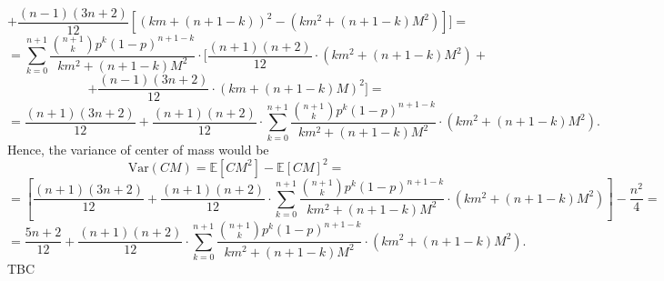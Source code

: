 \documentclass[11pt, twoside, reqno]{book}
\newcommand{\Var}{\text{Var}}
\newcommand{\E}{\mathbb{E}}
\begin{document}
$$+\frac{(n-1)(3n+2)}{12} \left[(km+(n+1-k))^{2}-(km^{2}+(n+1-k)M^{2})\right] \bigg]=$$
$$ =\sum_{k=0}^{n+1} \frac{\binom{n+1}{k}p^{k}(1-p)^{n+1-k}}{km^{2}+(n+1-k)M^2}\cdot \bigg[\frac{(n+1)(n+2)}{12}\cdot (km^{2}+(n+1-k)M^{2}) +$$
$$+ \frac{(n-1)(3n+2)}{12}\cdot (km+(n+1-k)M)^2 \bigg]=$$
$$=\frac{(n+1)(3n+2)}{12} +\frac{(n+1)(n+2)}{12} \cdot \sum_{k=0}^{n+1} \frac{\binom{n+1}{k}p^{k}(1-p)^{n+1-k}}{km^{2}+(n+1-k)M^2}\cdot \left(km^{2}+(n+1-k)M^{2}\right).$$
Hence, the variance of center of mass would be 
$$\Var(CM) = \E[CM^{2}]-\E[CM]^{2} =$$
$$=\left[ \frac{(n+1)(3n+2)}{12} +\frac{(n+1)(n+2)}{12} \cdot \sum_{k=0}^{n+1} \frac{\binom{n+1}{k}p^{k}(1-p)^{n+1-k}}{km^{2}+(n+1-k)M^2}\cdot \left(km^{2}+(n+1-k)M^{2}\right)\right] - \frac{n^{2}}{4}=$$
$$=\frac{5n+2}{12}+\frac{(n+1)(n+2)}{12} \cdot \sum_{k=0}^{n+1} \frac{\binom{n+1}{k}p^{k}(1-p)^{n+1-k}}{km^{2}+(n+1-k)M^2}\cdot \left(km^{2}+(n+1-k)M^{2}\right) .$$
TBC \\
\end{document}
